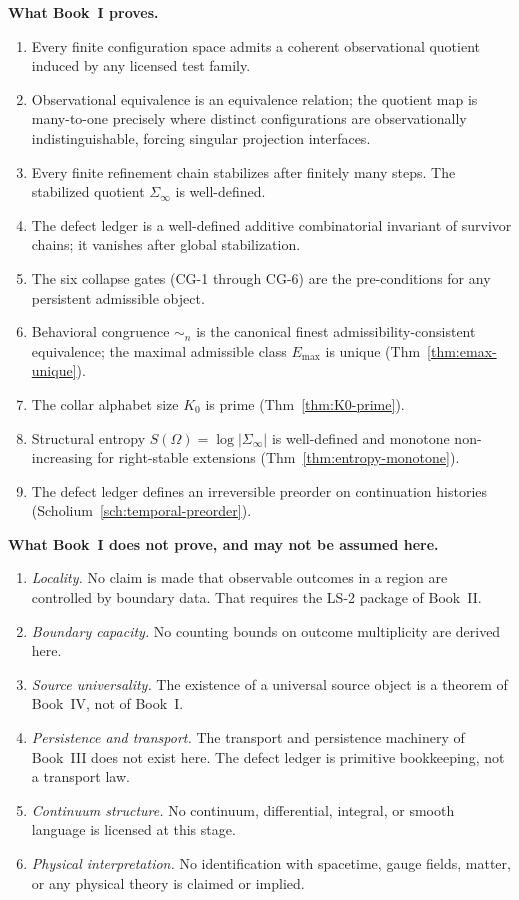 \documentclass[12pt,oneside]{amsbook}
\theoremstyle{plain}
\theoremstyle{definition}
\theoremstyle{remark}
\begin{document}
\textbf{What Book~I proves.}
\begin{enumerate}
  \item Every finite configuration space admits a coherent
        observational quotient induced by any licensed test family.
  \item Observational equivalence is an equivalence relation; the
        quotient map is many-to-one precisely where distinct
        configurations are observationally indistinguishable, forcing
        singular projection interfaces.
  \item Every finite refinement chain stabilizes after finitely many
        steps.  The stabilized quotient $\Sigma_\infty$ is well-defined.
  \item The defect ledger is a well-defined additive combinatorial
        invariant of survivor chains; it vanishes after global
        stabilization.
  \item The six collapse gates (CG-1 through CG-6) are the
        pre-conditions for any persistent admissible object.
  \item Behavioral congruence $\sim_n$ is the canonical finest
        admissibility-consistent equivalence; the maximal admissible
        class $E_{\max}$ is unique (Thm~\ref{thm:emax-unique}).
  \item The collar alphabet size $K_0$ is prime
        (Thm~\ref{thm:K0-prime}).
  \item Structural entropy $S(\Omega) = \log|\Sigma_\infty|$ is
        well-defined and monotone non-increasing for right-stable
        extensions (Thm~\ref{thm:entropy-monotone}).
  \item The defect ledger defines an irreversible preorder on
        continuation histories (Scholium~\ref{sch:temporal-preorder}).
\end{enumerate}

\textbf{What Book~I does not prove, and may not be assumed here.}
\begin{enumerate}
  \item \emph{Locality.}  No claim is made that observable outcomes
        in a region are controlled by boundary data.  That requires
        the LS-2 package of Book~II.
  \item \emph{Boundary capacity.}  No counting bounds on outcome
        multiplicity are derived here.
  \item \emph{Source universality.}  The existence of a universal
        source object is a theorem of Book~IV, not of Book~I.
  \item \emph{Persistence and transport.}  The transport and
        persistence machinery of Book~III does not exist here.  The
        defect ledger is primitive bookkeeping, not a transport law.
  \item \emph{Continuum structure.}  No continuum, differential,
        integral, or smooth language is licensed at this stage.
  \item \emph{Physical interpretation.}  No identification with
        spacetime, gauge fields, matter, or any physical theory is
        claimed or implied.
\end{enumerate}
\end{document}
